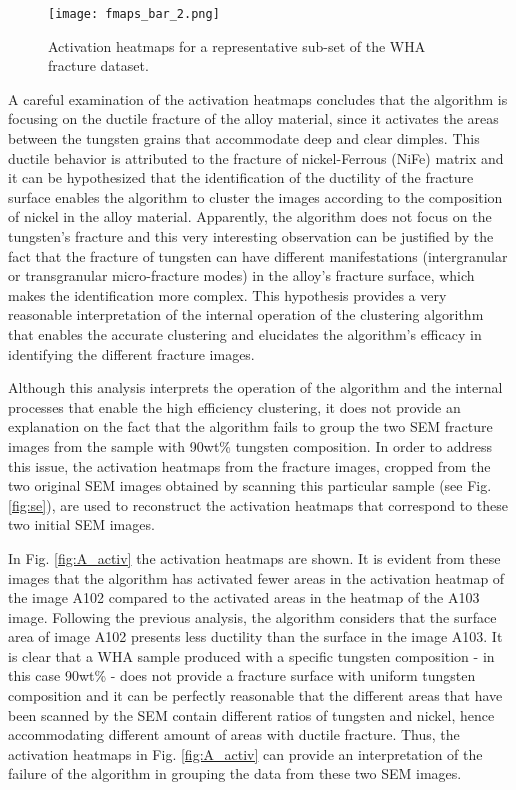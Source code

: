 \documentclass[authoryear,preprint,review,12pt, singleside]{elsarticle}
\begin{document}
\begin{figure}[H]
	\centering
	\texttt{[image: fmaps\_bar\_2.png]}
	\caption{Activation heatmaps for a representative sub-set of the WHA fracture dataset.}
	\label{fig:activ_maps}
\end{figure} 


A careful examination of the activation heatmaps concludes that the algorithm is focusing on the ductile fracture of the alloy material, since it activates the areas between the tungsten grains that accommodate deep and clear dimples. This ductile behavior is  attributed to the fracture of nickel-Ferrous (NiFe) matrix and it can be hypothesized that the identification of the ductility of the fracture surface enables the algorithm to cluster the images according to the composition of nickel in the alloy material. Apparently, the algorithm does not focus on the tungsten's fracture and this very interesting observation can be justified by the fact that the fracture of tungsten can have different manifestations (intergranular or transgranular micro-fracture modes) in the alloy's fracture surface, which makes the identification more complex. This hypothesis provides a very reasonable interpretation of the internal operation of the clustering algorithm that enables the accurate clustering and elucidates the algorithm's efficacy in identifying the different fracture images. 

Although this analysis interprets the operation of the algorithm and the internal processes that enable the high efficiency clustering, it does not provide an explanation on the fact that the algorithm fails to group the two SEM fracture images from the sample with 90wt\% tungsten composition. In order to address this issue, the activation heatmaps from the fracture images, cropped from the two original SEM images obtained by scanning this particular sample (see Fig. \ref{fig:se}), are used to reconstruct the activation heatmaps that correspond to these two initial SEM images. 

In Fig. \ref{fig:A_activ} the activation heatmaps are shown. It is evident from these images that the algorithm has activated fewer areas in the activation heatmap of the image A102 compared to the activated areas in the heatmap of the A103 image. Following the previous analysis, the algorithm considers that the surface area of image A102 presents less ductility than the surface in the image A103. It is clear that a WHA sample produced with a specific tungsten composition - in this case 90wt\% - does not provide a fracture surface with uniform tungsten composition and it can be perfectly reasonable that the different areas that have been scanned by the SEM contain different ratios of tungsten and nickel, hence accommodating different amount of areas with ductile fracture. Thus, the activation heatmaps in Fig. \ref{fig:A_activ} can provide an interpretation of the failure of the algorithm in grouping the data from these two SEM images.   
\end{document}
